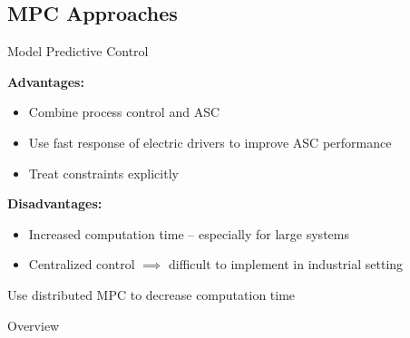 \subsection{MPC Approaches}
\begin{frame}{Model Predictive Control}

  {\bfseries Advantages:\\}
  \begin{itemize}
    \item Combine process control and ASC
    \item Use fast response of electric drivers to improve ASC performance
    \item Treat constraints explicitly
  \end{itemize}
  \vspace{1em}
  {\bfseries Disadvantages:\\}
  \begin{itemize}
    \item Increased computation time -- especially for large systems
    \item Centralized control $\implies$ difficult to implement in industrial setting
  \end{itemize}
  \vspace{1em}

  \pause

  {\centering
    \alert{Use distributed MPC to decrease computation time}\\
  }

\end{frame}

\begin{frame}{Overview}
  \begin{multicols}{2}
    \tableofcontents[%
  subsectionstyle=shaded/shaded/show,
sectionstyle=shaded/show]
  \end{multicols}
\end{frame}

